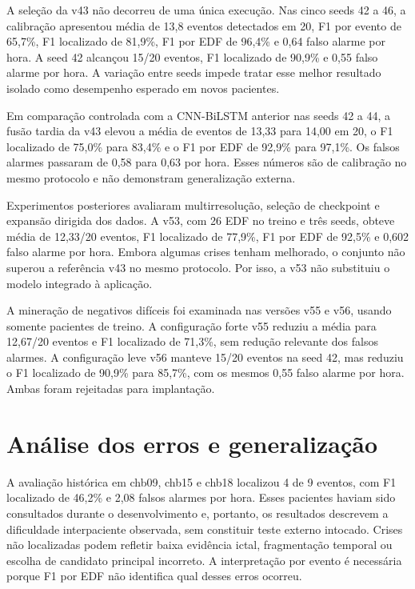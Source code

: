A seleção da v43 não decorreu de uma única execução. Nas cinco seeds 42 a 46, a calibração apresentou média de 13,8 eventos detectados em 20, F1 por evento de 65,7\%, F1 localizado de 81,9\%, F1 por EDF de 96,4\% e 0,64 falso alarme por hora. A seed 42 alcançou 15/20 eventos, F1 localizado de 90,9\% e 0,55 falso alarme por hora. A variação entre seeds impede tratar esse melhor resultado isolado como desempenho esperado em novos pacientes.

Em comparação controlada com a CNN-BiLSTM anterior nas seeds 42 a 44, a fusão tardia da v43 elevou a média de eventos de 13,33 para 14,00 em 20, o F1 localizado de 75,0\% para 83,4\% e o F1 por EDF de 92,9\% para 97,1\%. Os falsos alarmes passaram de 0,58 para 0,63 por hora. Esses números são de calibração no mesmo protocolo e não demonstram generalização externa.

Experimentos posteriores avaliaram multirresolução, seleção de checkpoint e expansão dirigida dos dados. A v53, com 26 EDF no treino e três seeds, obteve média de 12,33/20 eventos, F1 localizado de 77,9\%, F1 por EDF de 92,5\% e 0,602 falso alarme por hora. Embora algumas crises tenham melhorado, o conjunto não superou a referência v43 no mesmo protocolo. Por isso, a v53 não substituiu o modelo integrado à aplicação.

A mineração de negativos difíceis foi examinada nas versões v55 e v56, usando somente pacientes de treino. A configuração forte v55 reduziu a média para 12,67/20 eventos e F1 localizado de 71,3\%, sem redução relevante dos falsos alarmes. A configuração leve v56 manteve 15/20 eventos na seed 42, mas reduziu o F1 localizado de 90,9\% para 85,7\%, com os mesmos 0,55 falso alarme por hora. Ambas foram rejeitadas para implantação.

\section{Análise dos erros e generalização}
A avaliação histórica em chb09, chb15 e chb18 localizou 4 de 9 eventos, com F1 localizado de 46,2\% e 2,08 falsos alarmes por hora. Esses pacientes haviam sido consultados durante o desenvolvimento e, portanto, os resultados descrevem a dificuldade interpaciente observada, sem constituir teste externo intocado. Crises não localizadas podem refletir baixa evidência ictal, fragmentação temporal ou escolha de candidato principal incorreto. A interpretação por evento é necessária porque F1 por EDF não identifica qual desses erros ocorreu.

